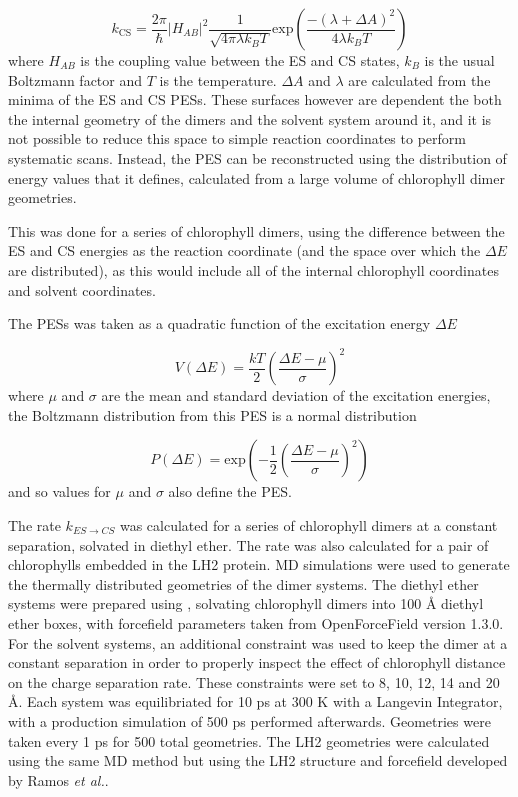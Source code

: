 \begin{equation}
    k_{\text{CS}} = \frac{2\pi}{\hbar} \left\lvert H_{AB} \right\rvert^2 \frac{1}{\sqrt{4 \pi \lambda k_B T}}\text{exp}\left(\frac{-\left(\lambda + \Delta A\right)^2}{4 \lambda k_B T}\right)
\end{equation}
%
where $H_{AB}$ is the coupling value between the ES and CS states, $k_B$ is the 
usual Boltzmann factor and $T$ is the temperature. $\Delta A$ and $\lambda$ are
calculated from the minima of the ES and CS PESs. These surfaces however are 
dependent the both the internal geometry of the dimers and the solvent system around
it, and it is not possible to reduce this space to simple reaction coordinates to 
perform systematic scans. Instead, the PES can be reconstructed using the distribution 
of energy values that it defines, calculated from a large volume of chlorophyll 
dimer geometries.

This was done for a series of chlorophyll dimers, using the difference between the
ES and CS energies as the reaction coordinate (and the space over which the $\Delta E$
are  distributed), as this would include all of the internal chlorophyll coordinates 
and solvent coordinates.

The PESs was taken as a quadratic function of the excitation energy $\Delta E$

\begin{equation}
    V\left(\Delta E\right) = \frac{kT}{2} \left( \frac{\Delta E - \mu}{\sigma}\right)^2
\end{equation}
%
where $\mu$ and $\sigma$ are the mean and standard deviation of the excitation energies,
the Boltzmann distribution from this PES is a normal distribution

\begin{equation}
    P\left(\Delta E\right) = \text{exp} \left(-\frac{1}{2}\left(\frac{\Delta E - \mu}{\sigma}\right)^2\right)
\end{equation}
%
and so values for $\mu$ and $\sigma$ also define the PES. 

The rate $k_{ES \rightarrow CS}$ was calculated for a series of chlorophyll dimers 
at a constant separation, solvated in diethyl ether. The rate was also calculated 
for a pair of chlorophylls embedded in the LH2 protein. MD simulations were used 
to generate  the thermally distributed geometries of the dimer systems. The diethyl
ether systems were prepared using , solvating chlorophyll dimers into 
100 \AA{} diethyl ether boxes, with forcefield parameters taken from OpenForceField 
version 1.3.0. For the solvent systems, an additional constraint was used to keep 
the dimer at a constant separation in order to properly inspect the effect of chlorophyll
distance on the charge separation rate. These constraints were set to 8, 10, 12,
14 and 20 \AA{}. Each system was equilibriated for 10 ps at 300 K with a
Langevin Integrator, with a production simulation of 500 ps performed afterwards. 
Geometries were taken every 1 ps for 500 total geometries. The LH2 geometries were
calculated using the same MD method but using the LH2 structure and forcefield developed
by Ramos \emph{et al.}.

